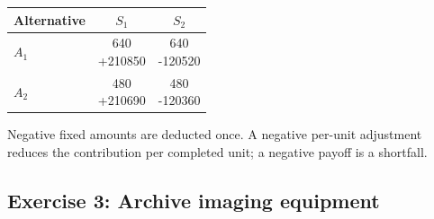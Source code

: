 \begin{CalculationLandscape}{11in}{8.5in}
{}{
\begin{tabular}{@{}lcc@{}}
\toprule Alternative & $S_1$ & $S_2$ \\ \midrule
$A_1$ & \CalcResult{640 \\ {}+210}{850} & \CalcResult{640 \\ {}-120}{520} \\[5pt]
$A_2$ & \CalcResult{480 \\ {}+210}{690} & \CalcResult{480 \\ {}-120}{360} \\[5pt]
\bottomrule
\end{tabular}
}
Negative fixed amounts are deducted once. A negative per-unit adjustment reduces the contribution per completed unit; a negative payoff is a shortfall.
\begingroup\renewcommand{\CalculationStateCount}{2}
\endgroup
\end{CalculationLandscape}
\newpage
\subsection{Exercise 3: Archive imaging equipment}
\label{sec:problem3-archive-imaging-equipment-c1-c2}
